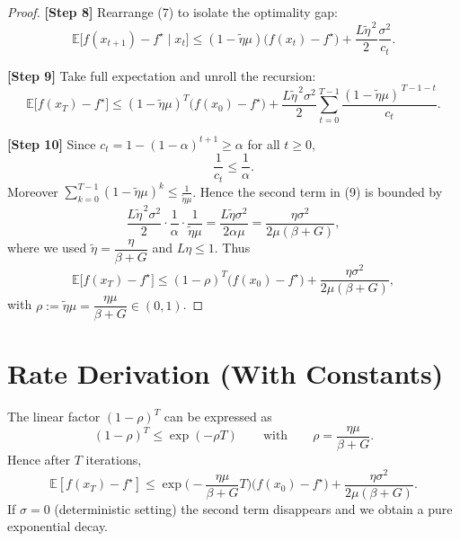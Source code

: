 \documentclass{article}
\begin{document}
\begin{proof}
\textbf{[Step 8]}  Rearrange (7) to isolate the optimality gap:
\[
\mathbb{E}\big[f(x_{t+1})-f^\star\mid x_t\big]
\le (1-\tilde\eta\mu)\big(f(x_t)-f^\star\big)
+\frac{L\tilde\eta^{\,2}}{2}\frac{\sigma^{2}}{c_t}.
\tag{8}
\]

\textbf{[Step 9]}  Take full expectation and unroll the recursion:
\[
\mathbb{E}\big[f(x_T)-f^\star\big]
\le (1-\tilde\eta\mu)^{T}\big(f(x_0)-f^\star\big)
+\frac{L\tilde\eta^{\,2}\sigma^{2}}{2}
\sum_{t=0}^{T-1}\frac{(1-\tilde\eta\mu)^{\,T-1-t}}{c_t}.
\tag{9}
\]

\textbf{[Step 10]}  Since $c_t=1-(1-\alpha)^{t+1}\ge\alpha$ for all $t\ge0$,
\[
\frac{1}{c_t}\le\frac{1}{\alpha}.
\]
Moreover $\sum_{k=0}^{T-1}(1-\tilde\eta\mu)^{k}\le\frac{1}{\tilde\eta\mu}$.
Hence the second term in (9) is bounded by
\[
\frac{L\tilde\eta^{\,2}\sigma^{2}}{2}\cdot\frac{1}{\alpha}\cdot\frac{1}{\tilde\eta\mu}
=
\frac{L\tilde\eta\sigma^{2}}{2\alpha\mu}
=
\frac{\eta\sigma^{2}}{2\mu(\beta+G)} ,
\]
where we used $\tilde\eta=\dfrac{\eta}{\beta+G}$ and $L\eta\le1$.
Thus
\[
\boxed{
\mathbb{E}\big[f(x_T)-f^\star\big]
\le (1-\rho)^{T}\big(f(x_0)-f^\star\big)
+\frac{\eta\sigma^{2}}{2\mu(\beta+G)}},
\]
with $\rho:=\tilde\eta\mu=\dfrac{\eta\mu}{\beta+G}\in(0,1)$.
\qedhere
\end{proof}

\section*{Rate Derivation (With Constants)}
The linear factor $(1-\rho)^{T}$ can be expressed as
\[
(1-\rho)^{T}\le\exp(-\rho T)
\qquad\text{with}\qquad
\rho=\frac{\eta\mu}{\beta+G}.
\]
Hence after $T$ iterations,
\[
\mathbb{E}[f(x_T)-f^\star]\le
\exp\!\Big(-\frac{\eta\mu}{\beta+G}T\Big)\big(f(x_0)-f^\star\big)
+\frac{\eta\sigma^{2}}{2\mu(\beta+G)}.
\]
If $\sigma=0$ (deterministic setting) the second term disappears and we obtain a
pure exponential decay.

\end{document}
